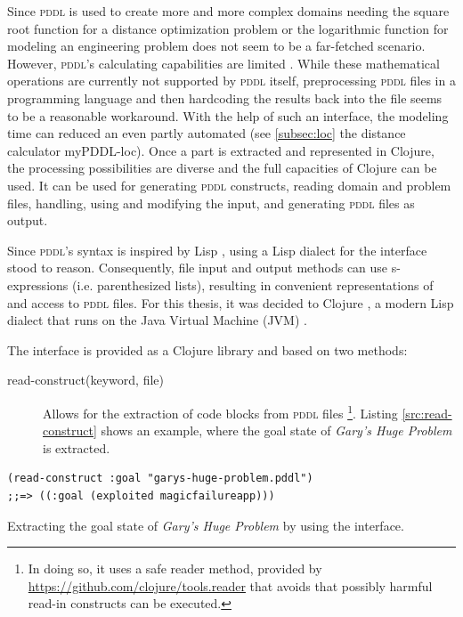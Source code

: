 \documentclass[a4paper,12pt]{report}
\newcommand{\mypddl}{\smallerft[0.8]{myPDDL}\xspace}
\newcommand{\pddl}{\textsc{pddl}\xspace}
\newcommand\smallerft[2][0.85]{{\scalefont{#1}#2}}
\begin{document}
Since \pddl is used to create more and more complex domains
\cite{goldman2012type,guerin2012academic} needing the square root
function for a distance optimization problem or the logarithmic
function for modeling an engineering problem does not seem to be a
far-fetched scenario. However, \pddl's calculating capabilities are
limited \cite{parkinson2012increasing}. While these mathematical
operations are currently not supported by \pddl itself, preprocessing
\pddl files in a programming language and then hardcoding the results
back into the file seems to be a reasonable workaround. With the help
of such an interface, the modeling time can reduced an even partly
automated (see \ref{subsec:loc} the distance calculator \mypddl-loc). Once a
part is extracted and represented in Clojure, the processing
possibilities are diverse and the full capacities of Clojure can be
used. It can be used for generating \pddl constructs, reading domain
and problem files, handling, using and modifying the input, and
generating \pddl files as output.

Since \pddl's syntax is inspired by Lisp \cite{fox2003pddl2}, using a
Lisp dialect for the interface stood to reason. Consequently, file
input and output methods can use s-expressions (i.e. parenthesized
lists), resulting in convenient representations of and access to \pddl
files. For this thesis, it was decided to Clojure
\parencite{hickey2008clojure}, a modern Lisp dialect that runs on the
Java Virtual Machine (JVM) \cite{lindholm2011virtual}.

The interface is provided as a Clojure library and based on two
methods:
\begin{description}
\item[{read-construct(keyword, file)}] Allows for the extraction of
code blocks from \pddl files \footnote{In doing so, it uses a safe reader method, provided by
\url{https://github.com/clojure/tools.reader} that avoids that possibly
harmful read-in constructs can be executed.}. Listing
\ref{src:read-construct} shows an example, where the goal state of
\emph{Gary's Huge Problem} is extracted.
\end{description}

\begin{listing}[H]
\begin{verbatim}
(read-construct :goal "garys-huge-problem.pddl")
;;=> ((:goal (exploited magicfailureapp)))
\end{verbatim}
\caption{\label{src:read-construct}Extracting the goal state of \emph{Gary's Huge Problem} by using the interface.}
\end{listing}
\end{document}
